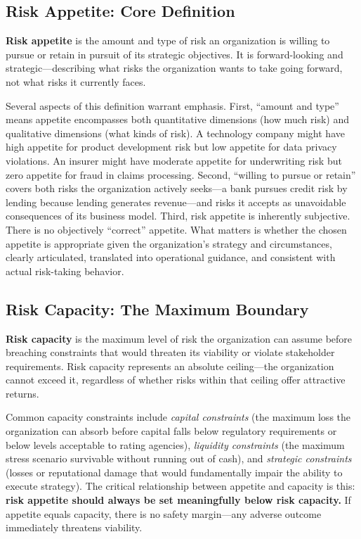 \documentclass[11pt,openany]{book}
\begin{document}
\subsection{Risk Appetite: Core Definition}
\label{subsec:appetite-definition}

\textbf{Risk appetite} is the amount and type of risk an organization is willing
to pursue or retain in pursuit of its strategic objectives. It is forward-looking
and strategic---describing what risks the organization wants to take going
forward, not what risks it currently faces.

Several aspects of this definition warrant emphasis. First, ``amount and type''
means appetite encompasses both quantitative dimensions (how much risk) and
qualitative dimensions (what kinds of risk). A technology company might have
high appetite for product development risk but low appetite for data privacy
violations. An insurer might have moderate appetite for underwriting risk but
zero appetite for fraud in claims processing. Second, ``willing to pursue or
retain'' covers both risks the organization actively seeks---a bank pursues
credit risk by lending because lending generates revenue---and risks it accepts
as unavoidable consequences of its business model. Third, risk appetite is
inherently subjective. There is no objectively ``correct'' appetite. What
matters is whether the chosen appetite is appropriate given the organization's
strategy and circumstances, clearly articulated, translated into operational
guidance, and consistent with actual risk-taking behavior.

\subsection{Risk Capacity: The Maximum Boundary}
\label{subsec:risk-capacity}

\textbf{Risk capacity} is the maximum level of risk the organization can assume
before breaching constraints that would threaten its viability or violate
stakeholder requirements. Risk capacity represents an absolute ceiling---the
organization cannot exceed it, regardless of whether risks within that ceiling
offer attractive returns.

Common capacity constraints include \emph{capital constraints} (the maximum loss
the organization can absorb before capital falls below regulatory requirements
or below levels acceptable to rating agencies), \emph{liquidity constraints} (the
maximum stress scenario survivable without running out of cash), and
\emph{strategic constraints} (losses or reputational damage that would
fundamentally impair the ability to execute strategy). The critical relationship
between appetite and capacity is this: \textbf{risk appetite should always be
set meaningfully below risk capacity.} If appetite equals capacity, there is no
safety margin---any adverse outcome immediately threatens viability.
\end{document}
